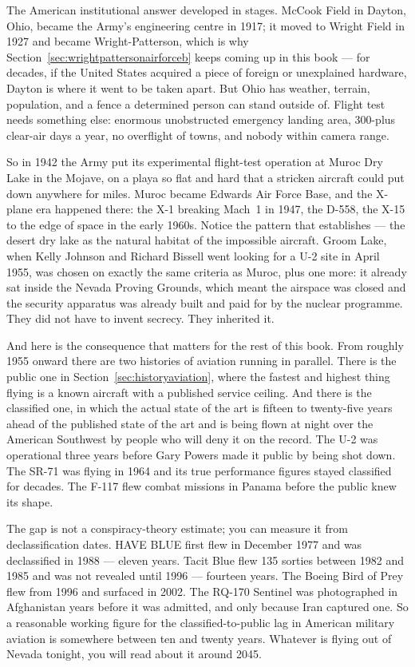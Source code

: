 The American institutional answer developed in stages. McCook Field in Dayton, Ohio, became the
Army's engineering centre in 1917; it moved to Wright Field in 1927 and became Wright-Patterson,
which is why Section~\ref{sec:wrightpattersonairforceb} keeps coming up in this book --- for decades, if the United States
acquired a piece of foreign or unexplained hardware, Dayton is where it went to be taken apart. But
Ohio has weather, terrain, population, and a fence a determined person can stand outside of. Flight
test needs something else: enormous unobstructed emergency landing area, 300-plus clear-air days a
year, no overflight of towns, and nobody within camera range.

So in 1942 the Army put its experimental flight-test operation at Muroc Dry Lake in the Mojave, on
a playa so flat and hard that a stricken aircraft could put down anywhere for miles. Muroc became
Edwards Air Force Base, and the X-plane era happened there: the X-1 breaking Mach~1 in 1947, the
D-558, the X-15 to the edge of space in the early 1960s. Notice the pattern that establishes ---
the desert dry lake as the natural habitat of the impossible aircraft. Groom Lake, when Kelly
Johnson and Richard Bissell went looking for a U-2 site in April 1955, was chosen on exactly the
same criteria as Muroc, plus one more: it already sat inside the Nevada Proving Grounds, which
meant the airspace was closed and the security apparatus was already built and paid for by the
nuclear programme. They did not have to invent secrecy. They inherited it.

And here is the consequence that matters for the rest of this book. From roughly 1955 onward there
are two histories of aviation running in parallel. There is the public one in Section~\ref{sec:historyaviation}, where
the fastest and highest thing flying is a known aircraft with a published service ceiling. And
there is the classified one, in which the actual state of the art is fifteen to twenty-five years
ahead of the published state of the art and is being flown at night over the American Southwest by
people who will deny it on the record. The U-2 was operational three years before Gary Powers made
it public by being shot down. The SR-71 was flying in 1964 and its true performance figures stayed
classified for decades. The F-117 flew combat missions in Panama before the public knew its shape.

\begin{funfact}
The gap is not a conspiracy-theory estimate; you can measure it from declassification dates. HAVE
BLUE first flew in December 1977 and was declassified in 1988 --- eleven years. Tacit Blue flew 135
sorties between 1982 and 1985 and was not revealed until 1996 --- fourteen years. The Boeing Bird of
Prey flew from 1996 and surfaced in 2002. The RQ-170 Sentinel was photographed in Afghanistan
years before it was admitted, and only because Iran captured one. So a reasonable working figure for
the classified-to-public lag in American military aviation is somewhere between ten and twenty
years. Whatever is flying out of Nevada tonight, you will read about it around 2045.
\end{funfact}

